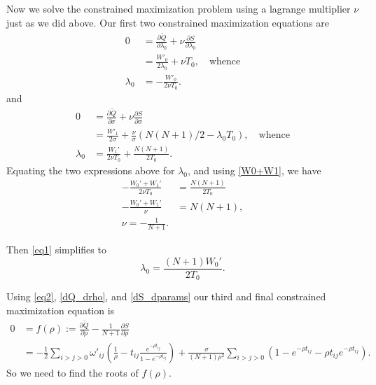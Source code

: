 \documentclass[12pt,leqno]{article}
\begin{document}
Now we solve the constrained maximization problem using a lagrange multiplier $\nu$ just as we did above.
Our first two constrained maximization equations are
\begin{equation}\label{eq1}
  \begin{split}
    0 &= \frac{\partial\tilde{Q}}{\partial\lambda_0} + \nu\frac{\partial{S}}{\partial\lambda_0} \\
    &=  \frac{W'_0}{2\lambda_0} + {\nu}T_0,\quad\text{whence}\\
    \lambda_0 &= -\frac{W'_0}{2\nu T_0}.
  \end{split}
\end{equation}
and
\begin{align*}
  0 &= \frac{\partial\tilde{Q}}{\partial\sigma} + \nu\frac{\partial{S}}{\partial\sigma} \\
  &= \frac{W'_1}{2\sigma} + \frac{\nu}{\sigma}(N(N+1)/2 - \lambda_0T_0),\quad\text{whence}\\
  \lambda_0 &= \frac{W_1'}{2\nu T_0} + \frac{N(N+1)}{2T_0}.
\end{align*}
Equating the two expressions above for $\lambda_0$, and using \eqref{W0+W1}, we have
\begin{equation}\label{eq2}
  \begin{split}
    -\frac{W_0'+W_1'}{2\nu T_0} &= \frac{N(N+1)}{2T_0} \\
    -\frac{W_0'+W_1'}{\nu} &= N(N+1), \\
    \nu = -\frac{1}{N+1}.
  \end{split}
\end{equation}

Then \eqref{eq1} simplifies to
\begin{equation} \label{lambda0:1}
    \lambda_0 = \frac{(N+1)W_0'}{2T_0}.
\end{equation}

Using \eqref{eq2}, \eqref{dQ_drho}, and \eqref{dS_dparams} our third and final constrained maximization
equation is
\begin{align*}
  0 &= f(\rho) := \frac{\partial\tilde{Q}}{\partial\rho} - \frac{1}{N+1}\frac{\partial{S}}{\partial\rho} \\
  &= -\frac{1}{2}\sum_{i>j>0}\omega'_{ij}\left(\frac{1}{\rho} - t_{ij}\frac{e^{-\rho{t_{ij}}}}{1-e^{-\rho t_{ij}}}\right)
  +\frac{\sigma}{(N+1)\rho^2}\sum_{i>j>0}\left(1 - e^{-\rho{t_{ij}}} - \rho t_{ij}e^{-\rho t_{ij}}\right).
\end{align*}
So we need to find the roots of $f(\rho)$.
\end{document}
